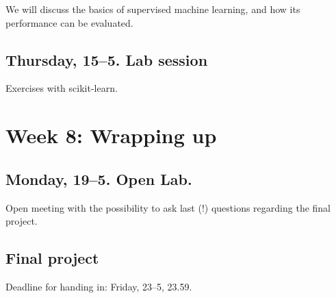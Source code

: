 We will discuss the basics of supervised machine learning, and how its performance can be evaluated. 

\subsection*{Thursday, 15--5. Lab session}
Exercises with scikit-learn.

\section*{Week 8: Wrapping up}

\subsection*{Monday, 19--5. Open Lab.}
Open meeting with the possibility to ask last (!) questions regarding the final project.

\subsection*{Final project}
Deadline for handing in: Friday, 23--5, 23.59.

